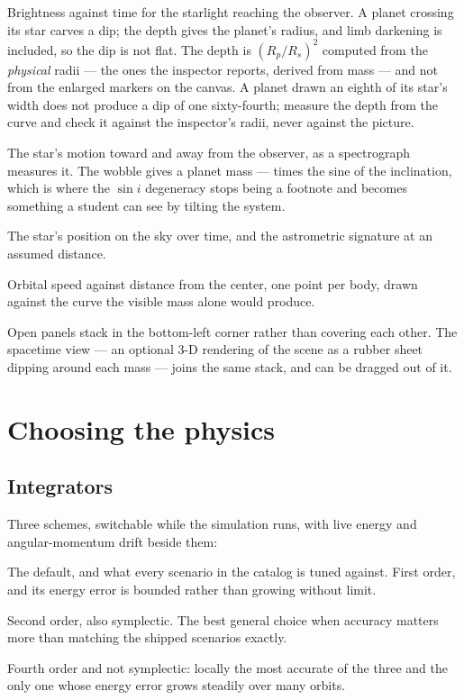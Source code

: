 \documentclass[11pt,a4paper]{article}
\begin{document}
\begin{description}[style=nextline,leftmargin=1em]
  \item[Transit light curve] Brightness against time for the starlight reaching
  the observer. A planet crossing its star carves a dip; the depth gives the
  planet's radius, and limb darkening is included, so the dip is not flat. The
  depth is $(R_p/R_s)^2$ computed from the \emph{physical} radii --- the ones
  the inspector reports, derived from mass --- and not from the enlarged
  markers on the canvas. A planet drawn an eighth of its star's width does not
  produce a dip of one sixty-fourth; measure the depth from the curve and check
  it against the inspector's radii, never against the picture.
  \item[Radial velocity] The star's motion toward and away from the observer, as
  a spectrograph measures it. The wobble gives a planet mass --- times the sine
  of the inclination, which is where the $\sin i$ degeneracy stops being a
  footnote and becomes something a student can see by tilting the system.
  \item[Astrometry] The star's position on the sky over time, and the
  astrometric signature at an assumed distance.
  \item[Rotation curve] Orbital speed against distance from the center, one point
  per body, drawn against the curve the visible mass alone would produce.
\end{description}

Open panels stack in the bottom-left corner rather than covering each other. The
spacetime view --- an optional 3-D rendering of the scene as a rubber sheet
dipping around each mass --- joins the same stack, and can be dragged out of it.

\section{Choosing the physics}

\subsection{Integrators}

Three schemes, switchable while the simulation runs, with live energy and
angular-momentum drift beside them:

\begin{description}[style=nextline,leftmargin=1em]
  \item[Symplectic Euler] The default, and what every scenario in the catalog is
  tuned against. First order, and its energy error is bounded rather than
  growing without limit.
  \item[Velocity Verlet] Second order, also symplectic. The best general choice
  when accuracy matters more than matching the shipped scenarios exactly.
  \item[RK4] Fourth order and not symplectic: locally the most accurate of the
  three and the only one whose energy error grows steadily over many orbits.
\end{description}
\end{document}
